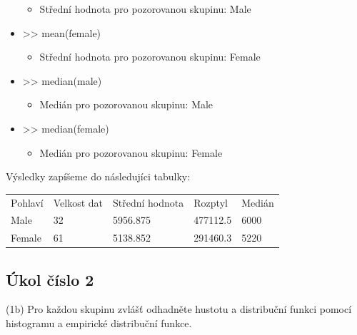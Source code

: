 \documentclass[paper=a4, fontsize=12pt]{scrartcl}
\numberwithin{equation}{section}		%
\numberwithin{figure}{section}			%
\numberwithin{table}{section}				%
\begin{document}
\begin{itemize}
		\begin{itemize}
		\item Střední hodnota pro pozorovanou skupinu: Male
		\end{itemize}
	\item >> mean(female)
		\begin{itemize}
		\item Střední hodnota pro pozorovanou skupinu: Female
		\end{itemize}
	\item >> median(male)
		\begin{itemize}
		\item Medián pro pozorovanou skupinu: Male
		\end{itemize}
	\item >> median(female)
		\begin{itemize}
		\item Medián pro pozorovanou skupinu: Female
		\end{itemize}
\end{itemize}
Výsledky zapíšeme do následujíci tabulky:\\
\begin{table}[htb]
\begin{tabular}{lllll}
\rowcolor[HTML]{EFEFEF}
Pohlaví & Velkost dat & Střední hodnota & Rozptyl & Medián \\
\cellcolor[HTML]{EFEFEF}Male     &     32       &         5956.875        &   477112.5      &   6000     \\
\cellcolor[HTML]{EFEFEF}Female   &      61       &         5138.852        &    291460.3     &   5220    
\end{tabular}
\end{table}

\subsection{Úkol číslo 2}
(1b) Pro každou skupinu zvlášť odhadněte hustotu a distribuční funkci pomocí histogramu a empirické distribuční funkce.
\end{document}

